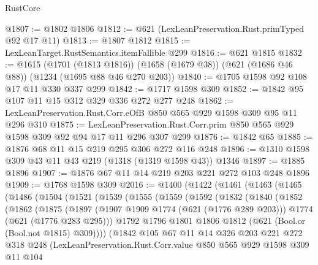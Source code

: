\begin{lexlean}{RustCore}
\begin{coremodule}
@1807 := @1802 @1806
@1812 := @621 (LexLeanPreservation.Rust.primTyped @92 @17 @11)
@1813 := @1807 @1812
@1815 := LexLeanTarget.RustSemantics.itemFallible @299
@1816 := @621 @1815
@1832 := @1615
    (@1701 (@1813 @1816))
    (@1658 (@1679 @38))
    (@621 (@1686 @46 @88))
    (@1234 (@1695 @88 @46 @270 @203))
@1840 := @1705 @1598 @92 @108 @17 @11 @330 @337 @299
@1842 := @1717 @1598 @309
@1852 := @1842 @95 @107 @11 @15 @312 @329 @336 @272 @277 @248
@1862 := LexLeanPreservation.Rust.Corr.eOfB @850 @565 @929 @1598 @309 @95 @11 @296 @310
@1875 := LexLeanPreservation.Rust.Corr.prim @850 @565 @929 @1598 @309 @92 @94 @17 @11 @296 @307 @299
@1876 := @1842 @65
@1885 := @1876 @68 @11 @15 @219 @295 @306 @272 @116 @248
@1896 := @1310 @1598 @309 @43 @11 @43 @219 (@1318 (@1319 @1598 @43)) @1346
@1897 := @1885 @1896
@1907 := @1876 @67 @11 @14 @219 @203 @221 @272 @103 @248 @1896
@1909 := @1768 @1598 @309
@2016 := @1400
    (@1422
      (@1461
        (@1463
          (@1465
            (@1486
              (@1504
                (@1521
                  (@1539
                    (@1555
                      (@1559
                        (@1592
                          (@1832
                            (@1840
                              (@1852
                                (@1862
                                  (@1875
                                    (@1897
                                      (@1907 @1909 @1774 (@621 (@1776 @289 @203)))
                                      @1774
                                      (@621 (@1776 @283 @295)))
                                    @1792
                                    @1796
                                    @1801
                                    @1806
                                    @1812
                                    (@621 (Bool.or (Bool.not @1815) @309))))
                                (@1842
                                  @105
                                  @67
                                  @11
                                  @14
                                  @326
                                  @203
                                  @221
                                  @272
                                  @318
                                  @248
                                  (LexLeanPreservation.Rust.Corr.value
                                    @850
                                    @565
                                    @929
                                    @1598
                                    @309
                                    @11
                                    @104

\end{coremodule}
\end{lexlean}
